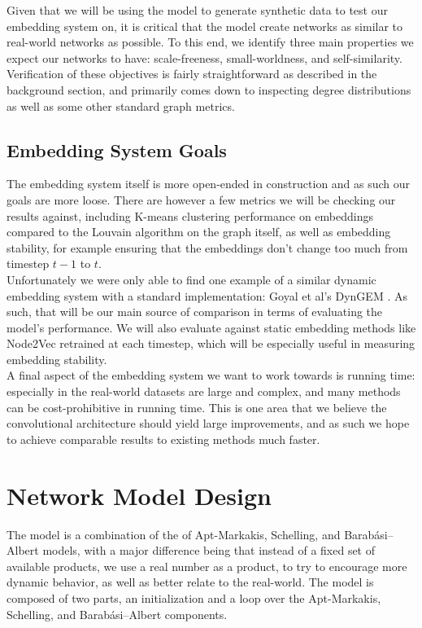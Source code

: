 \documentclass[12pt,twoside]{report}
\begin{document}
Given that we will be using the model to generate synthetic data to test our embedding system on, it is critical that the model create networks as similar to real-world networks as possible. To this end, we identify three main properties we expect our networks to have: scale-freeness, small-worldness, and self-similarity. Verification of these objectives is fairly straightforward as described in the background section, and primarily comes down to inspecting degree distributions as well as some other standard graph metrics. \\

\subsection{Embedding System Goals}

The embedding system itself is more open-ended in construction and as such our goals are more loose. There are however a few metrics we will be checking our results against, including K-means clustering performance on embeddings compared to the Louvain algorithm \cite{blondel2008fast} on the graph itself, as well as embedding stability, for example ensuring that the embeddings don't change too much from timestep $t-1$ to $t$. \\

Unfortunately we were only able to find one example of a similar dynamic embedding system with a standard implementation: Goyal et al's DynGEM \cite{goyal2018dyngem}. As such, that will be our main source of comparison in terms of evaluating the model's performance. We will also evaluate against static embedding methods like Node2Vec \cite{grover2016node2vec} retrained at each timestep, which will be especially useful in measuring embedding stability. \\

A final aspect of the embedding system we want to work towards is running time: especially in the real-world datasets are large and complex, and many methods can be cost-prohibitive in running time. This is one area that we believe the convolutional architecture should yield large improvements, and as such we hope to achieve comparable results to existing methods much faster. \\

\section{Network Model Design}

The model is a combination of the of Apt-Markakis, Schelling, and Barabási–Albert models, with a major difference being that instead of a fixed set of available products, we use a real number as a product, to try to encourage more dynamic behavior, as well as better relate to the real-world. The model is composed of two parts, an initialization and a loop over the Apt-Markakis, Schelling, and Barabási–Albert components. \\
\end{document}
